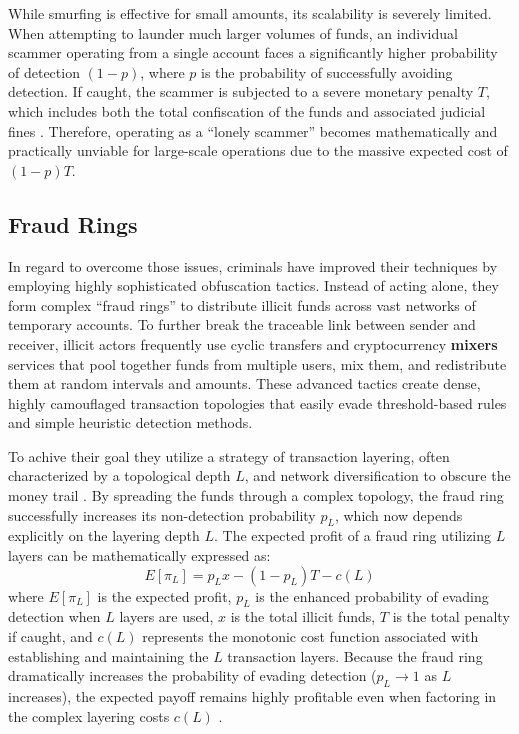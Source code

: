 While smurfing is effective for small amounts, its scalability is severely limited. When attempting to launder much larger volumes of funds, an individual scammer operating from a single account faces a significantly higher probability of detection $(1-p)$, where $p$ is the probability of successfully avoiding detection. If caught, the scammer is subjected to a severe monetary penalty $T$, which includes both the total confiscation of the funds and associated judicial fines \cite{contreras2026strategic}. Therefore, operating as a ``lonely scammer'' becomes mathematically and practically unviable for large-scale operations due to the massive expected cost of $(1-p)T$.

\subsection{Fraud Rings}
In regard to overcome those issues, criminals have improved their techniques by employing highly sophisticated obfuscation tactics. Instead of acting alone, they form complex ``fraud rings'' to distribute illicit funds across vast networks of temporary accounts. To further break the traceable link between sender and receiver, illicit actors frequently use cyclic transfers and cryptocurrency \textbf{mixers} services that pool together funds from multiple users, mix them, and redistribute them at random intervals and amounts. These advanced tactics create dense, highly camouflaged transaction topologies that easily evade threshold-based rules and simple heuristic detection methods.

To achive their goal they utilize a strategy of transaction layering, often characterized by a topological depth $L$, and network diversification to obscure the money trail \cite{contreras2026strategic, li2025scamsweeper}.
By spreading the funds through a complex topology, the fraud ring successfully increases its non-detection probability $p_L$, which now depends explicitly on the layering depth $L$. The expected profit of a fraud ring utilizing $L$ layers can be mathematically expressed as:
\begin{equation}
    E[\pi_L] = p_L x - (1-p_L)T - c(L)
\end{equation}
where $E[\pi_L]$ is the expected profit, $p_L$ is the enhanced probability of evading detection when $L$ layers are used, $x$ is the total illicit funds, $T$ is the total penalty if caught, and $c(L)$ represents the monotonic cost function associated with establishing and maintaining the $L$ transaction layers. Because the fraud ring dramatically increases the probability of evading detection ($p_L \to 1$ as $L$ increases), the expected payoff remains highly profitable even when factoring in the complex layering costs $c(L)$ \cite{contreras2026strategic}. 

